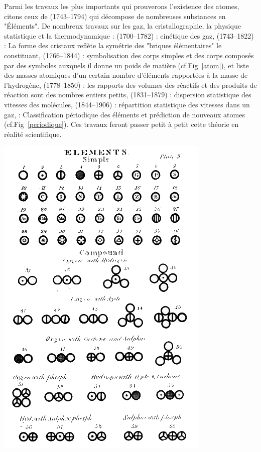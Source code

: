  Parmi les travaux les plus importants qui prouverons l'existence des atomes, citons ceux de  (\num{1743}--\num{1794}) qui décompose de nombreuses substances en "Éléments". De nombreux travaux sur les gaz, la cristallographie, la physique statistique et la thermodynamique :  (\num{1700}--\num{1782}) : cinétique des gaz,  (\num{1743}--\num{1822}) : La forme des cristaux reflète la symétrie des "briques élémentaires" le constituant,  (\num{1766}--\num{1844}) : symbolisation des corps simples et des corps composés par des symboles auxquels il donne un poids de matière (cf.Fig~\ref{atom}), et liste des masses atomiques d'un certain nombre d'éléments rapportées à la masse de l'hydrogène,  (\num{1778}--\num{1850}) : les rapports des volumes des réactifs et des produits de réaction sont des nombres entiers petits,  (\num{1831}--\num{1879}) : dispersion statistique des vitesses des molécules,  (\num{1844}--\num{1906}) : répartition statistique des vitesses dans un gaz,  : Classification périodique des éléments et prédiction de nouveaux atomes (cf.Fig~\ref{periodique}). Ces travaux feront passer petit à petit cette théorie en réalité scientifique. 
 
\marginpar
{
	\includegraphics[width=\marginparwidth]{SM/Dalton.png}
    \label{atom}
}

